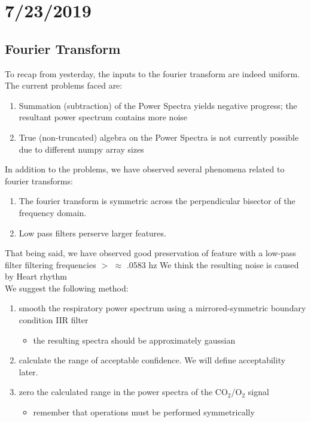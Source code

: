 \documentclass{article}
\begin{document}
\section*{7/23/2019}
\subsection*{Fourier Transform}
To recap from yesterday, the inputs to the fourier transform are indeed uniform. The current problems faced are:
\begin{enumerate}
  \item Summation (subtraction) of the Power Spectra yields negative progress; the resultant power spectrum contains more noise
  \item True (non-truncated) algebra on the Power Spectra is not currently possible due to different numpy array sizes
\end{enumerate}

In addition to the problems, we have observed several phenomena related to fourier transforms:
\begin{enumerate}
  \item The fourier transform is symmetric across the perpendicular bisector of the frequency domain.
  \item Low pass filters perserve larger features.
\end{enumerate}
That being said, we have observed good preservation of feature with a low-pass filter filtering frequencies  $>$ $\approx$ .0583 hz
We think the resulting noise is caused by Heart rhythm\\

We suggest the following method:
\begin{enumerate}
  \item smooth the respiratory power spectrum using a mirrored-symmetric boundary condition IIR filter
  \begin{itemize}
    \item the resulting spectra should be approximately gaussian
  \end{itemize}
  \item calculate the range of acceptable confidence. We will define acceptability later.
  \item zero the calculated range in the power spectra of the CO$_2$/O$_2$ signal
  \begin{itemize}
    \item remember that operations must be performed symmetrically
  \end{itemize}
\end{enumerate}
\end{document}
